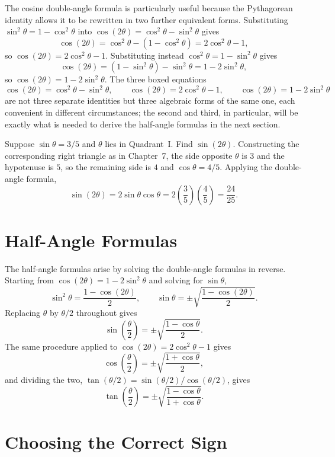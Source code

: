 The cosine double-angle formula is particularly useful because the
Pythagorean identity allows it to be rewritten in two further equivalent
forms. Substituting $\sin^2\theta = 1 - \cos^2\theta$ into
$\cos(2\theta) = \cos^2\theta - \sin^2\theta$ gives
\[
\cos(2\theta) = \cos^2\theta - (1-\cos^2\theta) = 2\cos^2\theta - 1,
\]
so $\boxed{\cos(2\theta) = 2\cos^2\theta - 1}$. Substituting instead
$\cos^2\theta = 1 - \sin^2\theta$ gives
\[
\cos(2\theta) = (1-\sin^2\theta) - \sin^2\theta = 1 - 2\sin^2\theta,
\]
so $\boxed{\cos(2\theta) = 1 - 2\sin^2\theta}$. The three boxed equations
\[
\cos(2\theta) = \cos^2\theta - \sin^2\theta, \qquad
\cos(2\theta) = 2\cos^2\theta - 1, \qquad
\cos(2\theta) = 1 - 2\sin^2\theta
\]
are not three separate identities but three algebraic forms of the same
one, each convenient in different circumstances; the second and third, in
particular, will be exactly what is needed to derive the half-angle
formulas in the next section.

\begin{example}
Suppose $\sin\theta = 3/5$ and $\theta$ lies in Quadrant~I. Find
$\sin(2\theta)$. Constructing the corresponding right triangle as in
Chapter~7, the side opposite $\theta$ is $3$ and the hypotenuse is $5$, so
the remaining side is $4$ and $\cos\theta = 4/5$. Applying the double-angle
formula,
\[
\sin(2\theta) = 2\sin\theta\cos\theta = 2\left(\frac35\right)\left(\frac45\right) = \frac{24}{25}.
\]
\end{example}

\section{Half-Angle Formulas}

The half-angle formulas arise by solving the double-angle formulas in
reverse. Starting from $\cos(2\theta) = 1 - 2\sin^2\theta$ and solving for
$\sin\theta$,
\[
\sin^2\theta = \frac{1-\cos(2\theta)}{2}, \qquad
\sin\theta = \pm\sqrt{\frac{1-\cos(2\theta)}{2}}.
\]
Replacing $\theta$ by $\theta/2$ throughout gives
\[
\boxed{\sin\left(\frac{\theta}{2}\right) = \pm\sqrt{\frac{1-\cos\theta}{2}}}.
\]
The same procedure applied to $\cos(2\theta) = 2\cos^2\theta - 1$ gives
\[
\boxed{\cos\left(\frac{\theta}{2}\right) = \pm\sqrt{\frac{1+\cos\theta}{2}}},
\]
and dividing the two, $\tan(\theta/2) = \sin(\theta/2)/\cos(\theta/2)$,
gives
\[
\boxed{\tan\left(\frac{\theta}{2}\right) = \pm\sqrt{\frac{1-\cos\theta}{1+\cos\theta}}}.
\]

\section{Choosing the Correct Sign}

